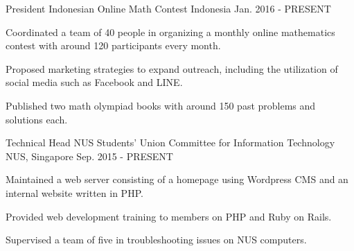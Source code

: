

\begin{cventries}


	\cventry
	{President} %
	{Indonesian Online Math Contest} %
	{Indonesia} %
	{Jan. 2016 - PRESENT} %
	{ %
		\begin{cvitems}
		\item {Coordinated a team of 40 people in organizing a monthly online mathematics contest with around 120 participants every month.}
		\item {Proposed marketing strategies to expand outreach, including the utilization of social media such as Facebook and LINE.}
		\item {Published two math olympiad books with around 150 past problems and solutions each.}
		\end{cvitems}
	}


	\cventry
	{Technical Head} %
	{NUS Students' Union Committee for Information Technology} %
	{NUS, Singapore} %
	{Sep. 2015 - PRESENT} %
	{ %
		\begin{cvitems}
		\item {Maintained a web server consisting of a homepage using Wordpress CMS and an internal website written in PHP.}
		\item {Provided web development training to members on PHP and Ruby on Rails.}
		\item {Supervised a team of five in troubleshooting issues on NUS computers.}
		\end{cvitems}
	}


\end{cventries}
